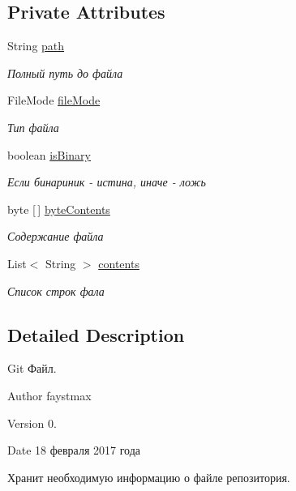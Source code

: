 \subsection*{Private Attributes}
\begin{DoxyCompactItemize}
\item 
String \hyperlink{classcom_1_1selesse_1_1gitwrapper_1_1myobjects_1_1_git_file_a2dd95a7e30e954c75cb4db8a36abcb0c}{path}
\begin{DoxyCompactList}\small\item\em Полный путь до файла \end{DoxyCompactList}\item 
File\+Mode \hyperlink{classcom_1_1selesse_1_1gitwrapper_1_1myobjects_1_1_git_file_a0d5165c79ab41bf64904905063080306}{file\+Mode}
\begin{DoxyCompactList}\small\item\em Тип файла \end{DoxyCompactList}\item 
boolean \hyperlink{classcom_1_1selesse_1_1gitwrapper_1_1myobjects_1_1_git_file_a6ffbe324cf2df788c533cfc25130b0fe}{is\+Binary}
\begin{DoxyCompactList}\small\item\em Если бинариник -\/ истина, иначе -\/ ложь \end{DoxyCompactList}\item 
byte \mbox{[}$\,$\mbox{]} \hyperlink{classcom_1_1selesse_1_1gitwrapper_1_1myobjects_1_1_git_file_adfd9d90077af28121d47ac5f73666175}{byte\+Contents}
\begin{DoxyCompactList}\small\item\em Содержание файла \end{DoxyCompactList}\item 
List$<$ String $>$ \hyperlink{classcom_1_1selesse_1_1gitwrapper_1_1myobjects_1_1_git_file_aa1f90a5b9ff9b6b885411ea81fbd0759}{contents}
\begin{DoxyCompactList}\small\item\em Список строк фала \end{DoxyCompactList}\end{DoxyCompactItemize}


\subsection{Detailed Description}
Git Файл. 

\begin{DoxyAuthor}{Author}
faystmax 
\end{DoxyAuthor}
\begin{DoxyVersion}{Version}
0. 
\end{DoxyVersion}
\begin{DoxyDate}{Date}
18 февраля 2017 года 
\end{DoxyDate}
Хранит необходимую информацию о файле репозитория. 

